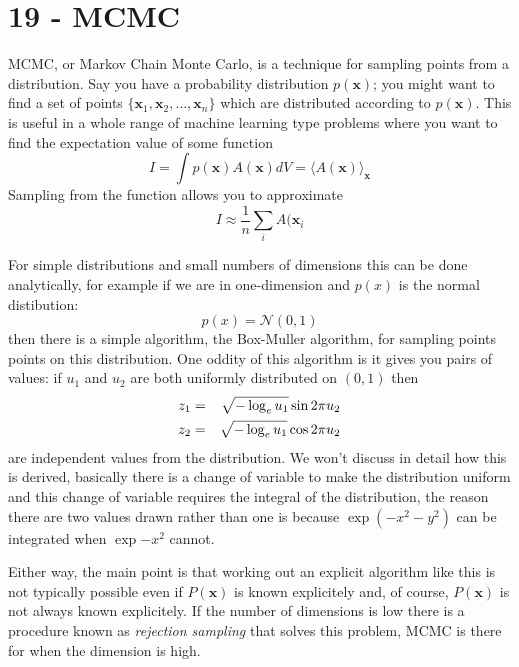 \documentclass[11pt,a4paper]{scrartcl}
\begin{document}
\section*{19 - MCMC}

MCMC, or Markov Chain Monte Carlo, is a technique for sampling points
from a distribution. Say you have a probability distribution
$p(\mathbf{x})$; you might want to find a set of points
$\{\mathbf{x}_1,\mathbf{x}_2,\ldots,\mathbf{x}_n\}$ which are
distributed according to $p(\mathbf{x})$. This is useful in a whole
range of machine learning type problems where you want to find the
expectation value of some function
\begin{equation}
I=\int p(\textbf{x})A(\textbf{x})dV=\langle A(\textbf{x})\rangle_{\mathbf{x}}
\end{equation}
Sampling from the function allows you to approximate
\begin{equation}
I\approx \frac{1}{n}\sum_i A(\textbf{x}_i
\end{equation}

For simple distributions and small numbers of dimensions this can be
done analytically, for example if we are in one-dimension and $p(x)$
is the normal distibution:
\begin{equation}
p(x)=\mathcal{N}(0,1)
\end{equation}
then there is a simple algorithm, the Box-Muller algorithm, for
sampling points points on this distribution. One oddity of this algorithm is it gives you pairs of values: if $u_1$ and $u_2$ are
both uniformly distributed on $(0,1)$ then
\begin{eqnarray}
z_1&=&\sqrt{-\log_e{u_1}}\sin{2\pi u_2}\cr
z_2&=&\sqrt{-\log_e{u_1}}\cos{2\pi u_2}\cr
\end{eqnarray}
are independent values from the distribution. We won't discuss in
detail how this is derived, basically there is a change of variable to
make the distribution uniform and this change of variable requires the
integral of the distribution, the reason there are two values drawn
rather than one is because $\exp(-x^2-y^2)$ can be integrated when
$\exp{-x^2}$ cannot. 

Either way, the main point is that working out an explicit algorithm
like this is not typically possible even if $P(\mathbf{x})$ is known
explicitely and, of course, $P(\mathbf{x})$ is not always known
explicitely. If the number of dimensions is low there is a procedure
known as \textsl{rejection sampling} that solves this problem, MCMC is
there for when the dimension is high.
\end{document}
